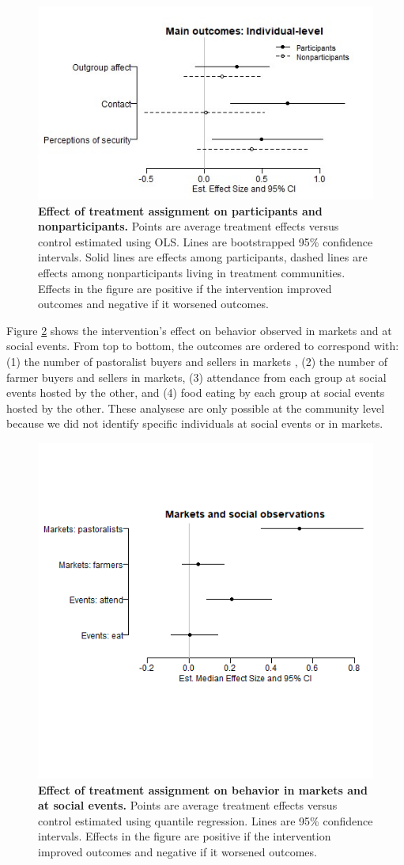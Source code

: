 \documentclass[11pt]{article}
\begin{document}
\begin{figure}[H]
\centering
\includegraphics[width=.7\textwidth]{../../../figs/ecpn_coefplots_MainOuts_panel-cats2.jpg}
\caption{\label{fig:fig2} \textbf{Effect of treatment assignment on participants and nonparticipants.} Points are average treatment effects versus control estimated using OLS. Lines are bootstrapped 95\% confidence intervals.  Solid lines are effects among participants, dashed lines are effects among nonparticipants living in treatment communities.  Effects in the figure are positive if the intervention improved outcomes and negative if it worsened outcomes.}
\end{figure}

Figure \ref{fig:obs} shows the intervention's effect on behavior
observed in markets and at social events. From top to bottom, the
outcomes are ordered to correspond with: (1) the number of pastoralist
buyers and sellers in markets , (2) the number of farmer buyers and
sellers in markets, (3) attendance from each group at social events
hosted by the other, and (4) food eating by each group at social events
hosted by the other. These analysese are only possible at the community
level because we did not identify specific individuals at social events
or in markets.

\begin{figure}[H]
\centering
\includegraphics[width=.7\textwidth]{../../../figs/ecpn_coefplots_markEvents.png}
\vspace{-1cm}
\caption{\label{fig:obs} \textbf{Effect of treatment assignment on behavior in markets and at social events.} Points are average treatment effects versus control estimated using quantile regression. Lines are 95\% confidence intervals.  Effects in the figure are positive if the intervention improved outcomes and negative if it worsened outcomes.}
\end{figure}
\end{document}
